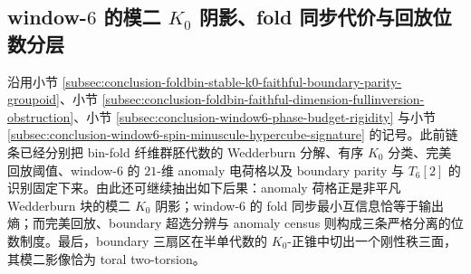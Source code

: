 \subsection{window-\texorpdfstring{$6$}{6} 的模二 \texorpdfstring{$K_0$}{K0} 阴影、fold 同步代价与回放位数分层}\label{subsec:conclusion-window6-mod2-k0-sync-replay-boundary-face}
沿用小节 \ref{subsec:conclusion-foldbin-stable-k0-faithful-boundary-parity-groupoid}、小节 \ref{subsec:conclusion-foldbin-faithful-dimension-fullinversion-obstruction}、小节 \ref{subsec:conclusion-window6-phase-budget-rigidity} 与小节 \ref{subsec:conclusion-window6-spin-minuscule-hypercube-signature} 的记号。此前链条已经分别把 bin-fold 纤维群胚代数的 Wedderburn 分解、有序 \(K_0\) 分类、完美回放阈值、window-\(6\) 的 \(21\)-维 anomaly 电荷格以及 boundary parity 与 \(T_6[2]\) 的识别固定下来。由此还可继续抽出如下后果：anomaly 荷格正是非平凡 Wedderburn 块的模二 \(K_0\) 阴影；window-\(6\) 的 fold 同步最小互信息恰等于输出熵；而完美回放、boundary 超选分辨与 anomaly census 则构成三条严格分离的位数制度。最后，boundary 三扇区在半单代数的 \(K_0\)-正锥中切出一个刚性秩三面，其模二影像恰为 toral two-torsion。

